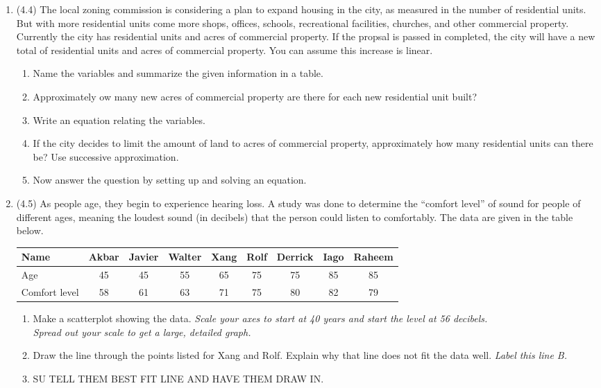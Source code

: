 \documentclass[12pt]{article}
\begin{document}
\begin{enumerate}
\item (4.4) The local zoning commission is considering a plan to expand housing in the city, as measured in the number of residential units.  But with more residential units come more shops, offices, schools, recreational facilities, churches, and other commercial property. Currently the city has  residential units and  acres of commercial property.  If the propsal is passed in completed, the city will have a new total of  residential units and  acres of commercial property.  You can assume this increase is linear.
\begin{enumerate}
\item Name the variables and summarize the given information in a table.
\item Approximately ow many new acres of commercial property are there for each new residential unit built?
\item Write an equation relating the variables.
\item If the city decides to limit the amount of land to  acres of commercial property, approximately how many residential units can there be?  Use successive approximation. 
\item Now answer the question by setting up and solving an equation.
\end{enumerate}

\item (4.5) As people age, they begin to experience hearing loss.  A study was done to determine the ``comfort level'' of sound for people of different ages, meaning the loudest sound (in decibels) that the person could listen to comfortably.  The data are given in the table below.
\begin{center}
\begin{tabular} {|l |c |c |c |c |c |c |c |c |} \hline
Name & Akbar & Javier & Walter & Xang & Rolf & Derrick & Iago &Raheem \\ \hline
Age & 45 & 45 & 55 & 65 & 75 & 75 & 85 & 85\\ \hline
Comfort level & 58 & 61 & 63 & 71 & 75 & 80 & 82 & 79 \\ \hline
\end{tabular}
\end{center}
\begin{enumerate}
\item Make a scatterplot showing the data.  
\emph{Scale your axes to start at 40 years and start the level at 56 decibels.  \\ Spread out your scale to get a large, detailed graph.}
\item  Draw the line through the points listed for Xang and Rolf.  Explain why that line does not fit the data well.  \emph{Label this line B.}
\item  SU TELL THEM BEST FIT LINE AND HAVE THEM DRAW IN.
\end{enumerate}



\end{enumerate}
\end{document}
